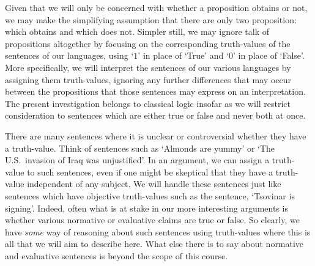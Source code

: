 Given that we will only be concerned with whether a proposition obtains or not, we may make the simplifying assumption that there are only two proposition:  which obtains and  which does not.
Simpler still, we may ignore talk of propositions altogether by focusing on the corresponding truth-values of the sentences of our languages, using `$1$' in place of `True' and `$0$' in place of `False'.
More specifically, we will interpret the sentences of our various languages by assigning them truth-values, ignoring any further differences that may occur between the propositions that those sentences may express on an interpretation.
The present investigation belongs to classical logic insofar as we will restrict consideration to sentences which are either true or false and never both at once.




There are many sentences where it is unclear or controversial whether they have a truth-value.
Think of sentences such as `Almonds are yummy' or `The U.S.\ invasion of Iraq was unjustified'.
In an argument, we can assign a truth-value to such sentences, even if one might be skeptical that they have a truth-value independent of any subject.
We will handle these sentences just like sentences which have objective truth-values such as the sentence, `Tsovinar is signing'.
Indeed, often what is at stake in our more interesting arguments is whether various normative or evaluative claims are true or false.
So clearly, we have \textit{some} way of reasoning about such sentences using truth-values where this is all that we will aim to describe here.
What else there is to say about normative and evaluative sentences is beyond the scope of this course.

